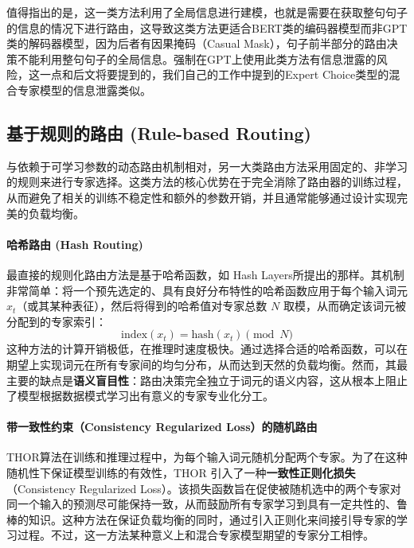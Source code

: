 值得指出的是，这一类方法利用了全局信息进行建模，也就是需要在获取整句句子的信息的情况下进行路由，这导致这类方法更适合BERT类的编码器模型而非GPT类的解码器模型，因为后者有因果掩码（Casual Mask），句子前半部分的路由决策不能利用整句句子的全局信息。强制在GPT上使用此类方法有信息泄露的风险\cite{Clark2022UnifiedSL}，这一点和后文将要提到的，我们自己的工作\cite{Wang2024AuxiliaryLossFreeLB}中提到的Expert Choice类型的混合专家模型\cite{Zhou2022MixtureofExpertsWE}的信息泄露类似。


\subsection{基于规则的路由 (Rule-based Routing)}
与依赖于可学习参数的动态路由机制相对，另一大类路由方法采用固定的、非学习的规则来进行专家选择。这类方法的核心优势在于完全消除了路由器的训练过程，从而避免了相关的训练不稳定性和额外的参数开销，并且通常能够通过设计实现完美的负载均衡。

\paragraph{哈希路由 (Hash Routing)}
最直接的规则化路由方法是基于哈希函数，如 Hash Layers\cite{Roller2021HashLF}所提出的那样。其机制非常简单：将一个预先选定的、具有良好分布特性的哈希函数应用于每个输入词元 $x_t$（或其某种表征），然后将得到的哈希值对专家总数 $N$ 取模，从而确定该词元被分配到的专家索引：
\begin{equation}
\text{index}(x_t) = \text{hash}(x_t) \pmod N
\end{equation}
这种方法的计算开销极低，在推理时速度极快。通过选择合适的哈希函数，可以在期望上实现词元在所有专家间的均匀分布，从而达到天然的负载均衡。然而，其最主要的缺点是\textbf{语义盲目性}：路由决策完全独立于词元的语义内容，这从根本上阻止了模型根据数据模式学习出有意义的专家专业化分工。

\paragraph{带一致性约束（Consistency Regularized Loss）的随机路由}
THOR\cite{Zuo2021TamingSA}算法在训练和推理过程中，为每个输入词元随机分配两个专家。为了在这种随机性下保证模型训练的有效性，THOR 引入了一种\textbf{一致性正则化损失}（Consistency Regularized Loss）。该损失函数旨在促使被随机选中的两个专家对同一个输入的预测尽可能保持一致，从而鼓励所有专家学习到具有一定共性的、鲁棒的知识。这种方法在保证负载均衡的同时，通过引入正则化来间接引导专家的学习过程。不过，这一方法某种意义上和混合专家模型期望的专家分工相悖。

